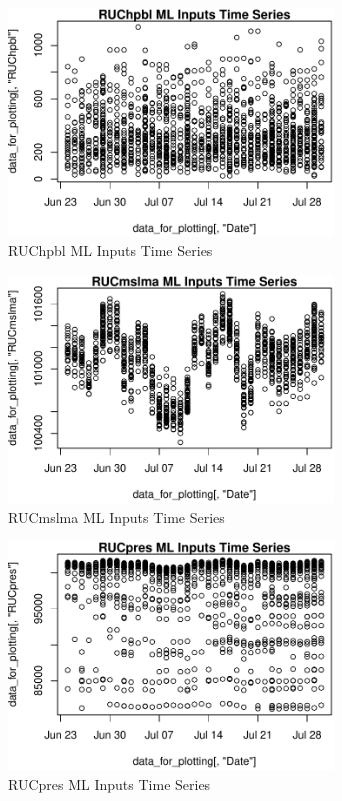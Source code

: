 \begin{figure} 
\centering  
\includegraphics[width=0.77\textwidth]{Code_Outputs/ML_input_report_AllforCaret_cleaned_StepPractice_part_practice_RUChpblTS.pdf} 
\caption{\label{fig:ML_input_report_AllforCaret_cleaned_StepPractice_part_practiceRUChpblTS}RUChpbl ML Inputs Time Series} 
\end{figure} 
 

\begin{figure} 
\centering  
\includegraphics[width=0.77\textwidth]{Code_Outputs/ML_input_report_AllforCaret_cleaned_StepPractice_part_practice_RUCmslmaTS.pdf} 
\caption{\label{fig:ML_input_report_AllforCaret_cleaned_StepPractice_part_practiceRUCmslmaTS}RUCmslma ML Inputs Time Series} 
\end{figure} 
 

\begin{figure} 
\centering  
\includegraphics[width=0.77\textwidth]{Code_Outputs/ML_input_report_AllforCaret_cleaned_StepPractice_part_practice_RUCpresTS.pdf} 
\caption{\label{fig:ML_input_report_AllforCaret_cleaned_StepPractice_part_practiceRUCpresTS}RUCpres ML Inputs Time Series} 
\end{figure} 
 

